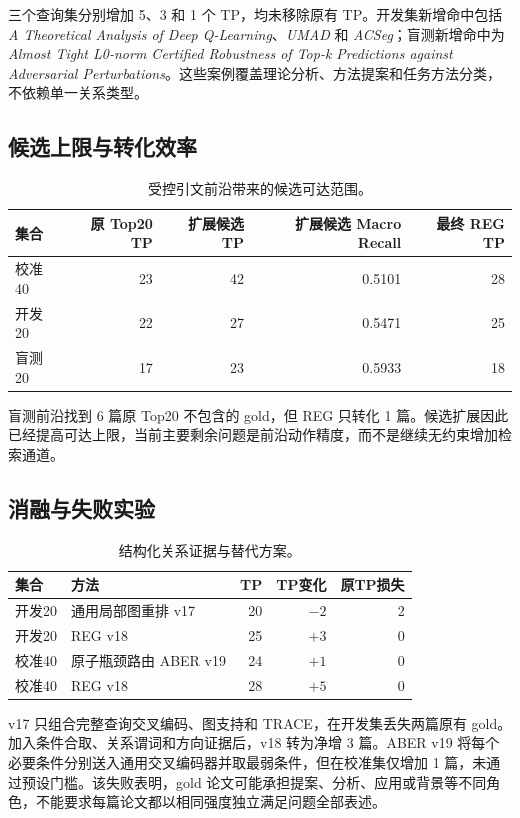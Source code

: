\documentclass[a4paper,11pt]{ctexart}
\begin{document}
三个查询集分别增加 5、3 和 1 个 TP，均未移除原有 TP。开发集新增命中包括 \emph{A Theoretical Analysis of Deep Q-Learning}、\emph{UMAD} 和 \emph{ACSeg}；盲测新增命中为 \emph{Almost Tight L0-norm Certified Robustness of Top-k Predictions against Adversarial Perturbations}。这些案例覆盖理论分析、方法提案和任务方法分类，不依赖单一关系类型。

\subsection{候选上限与转化效率}
\begin{table}[H]
\centering
\caption{受控引文前沿带来的候选可达范围。}
\begin{tabular}{lrrrr}
\toprule
集合 & 原 Top20 TP & 扩展候选 TP & 扩展候选 Macro Recall & 最终 REG TP\\
\midrule
校准40 & 23 & 42 & 0.5101 & 28\\
开发20 & 22 & 27 & 0.5471 & 25\\
盲测20 & 17 & 23 & 0.5933 & 18\\
\bottomrule
\end{tabular}
\end{table}

盲测前沿找到 6 篇原 Top20 不包含的 gold，但 REG 只转化 1 篇。候选扩展因此已经提高可达上限，当前主要剩余问题是前沿动作精度，而不是继续无约束增加检索通道。

\subsection{消融与失败实验}
\begin{table}[H]
\centering
\caption{结构化关系证据与替代方案。}
\begin{tabular}{llrrr}
\toprule
集合 & 方法 & TP & TP变化 & 原TP损失\\
\midrule
开发20 & 通用局部图重排 v17 & 20 & $-2$ & 2\\
开发20 & REG v18 & 25 & $+3$ & 0\\
校准40 & 原子瓶颈路由 ABER v19 & 24 & $+1$ & 0\\
校准40 & REG v18 & 28 & $+5$ & 0\\
\bottomrule
\end{tabular}
\end{table}

v17 只组合完整查询交叉编码、图支持和 TRACE，在开发集丢失两篇原有 gold。加入条件合取、关系谓词和方向证据后，v18 转为净增 3 篇。ABER v19 将每个必要条件分别送入通用交叉编码器并取最弱条件，但在校准集仅增加 1 篇，未通过预设门槛。该失败表明，gold 论文可能承担提案、分析、应用或背景等不同角色，不能要求每篇论文都以相同强度独立满足问题全部表述。
\end{document}

